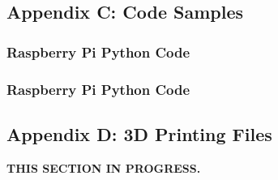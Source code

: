 \documentclass{article}
\begin{document}
	\subsection{Appendix C: Code Samples \label{appendix:code}}
	
		\subsubsection{Raspberry Pi Python Code}
		
		\subsubsection{Raspberry Pi Python Code}
	
	\subsection{Appendix D: 3D Printing Files}
	\textbf{THIS SECTION IN PROGRESS.}
	
\end{document}
